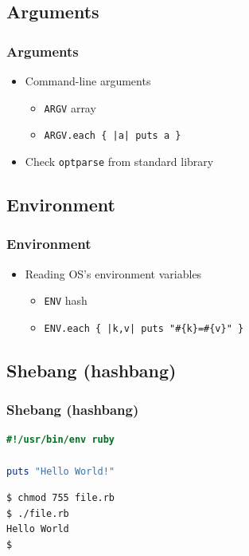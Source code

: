 \subsection{Arguments}
\begin{frame}[fragile]\frametitle{Arguments}

\begin{itemize}

\item Command-line arguments

\begin{itemize}
\item \texttt{ARGV} array
\item \texttt{ARGV.each \{ |a| puts a \}}
\end{itemize}

\item Check \texttt{optparse} from standard library

\end{itemize}

\end{frame}




\subsection{Environment}
\begin{frame}[fragile]\frametitle{Environment}

\begin{itemize}

\item Reading OS's environment variables

\begin{itemize}
\item \texttt{ENV} hash
\item \texttt{ENV.each \{ |k,v| puts "\#\{k\}=\#\{v\}" \} }
\end{itemize}

\end{itemize}

\end{frame}




\subsection{Shebang (hashbang)}
\begin{frame}[fragile]\frametitle{Shebang (hashbang)}
\begin{lstlisting}[language=ruby, escapechar={^}]
#!/usr/bin/env ruby

puts "Hello World!"
\end{lstlisting}
\pause
\begin{lstlisting}[language=bash, escapechar={^}]
$ chmod 755 file.rb
$ ./file.rb
Hello World
$
\end{lstlisting}
\end{frame}





